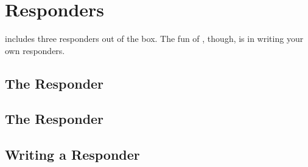 \section{Responders \label{responders}}

 includes three responders out of the box. The fun of
, though, is in writing your own responders.


\subsection{The  Responder \label{static}}
\subsection{The  Responder \label{xmlrpc}}
\subsection{Writing a Responder \label{writing-a-responder}}

